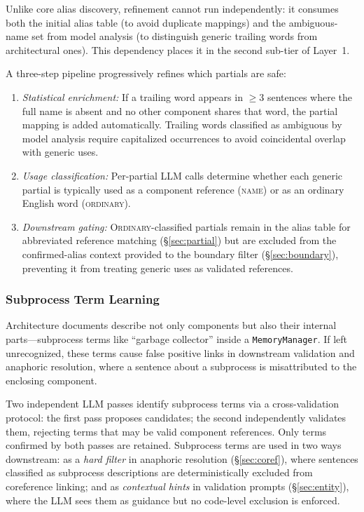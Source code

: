 Unlike core alias discovery, refinement cannot run independently:
it consumes both the initial alias table (to avoid duplicate mappings)
and the ambiguous-name set from model analysis (to distinguish generic
trailing words from architectural ones).
This dependency places it in the second sub-tier of Layer~1.

A three-step pipeline progressively refines which partials are safe:
\begin{enumerate}
    \item \emph{Statistical enrichment:}
      If a trailing word appears in $\ge3$ sentences where the full
      name is absent and no other component shares that word, the
      partial mapping is added automatically.
      Trailing words classified as ambiguous by model analysis
      require capitalized occurrences to avoid coincidental overlap
      with generic uses.
    \item \emph{Usage classification:}
      Per-partial LLM calls determine whether each generic partial
      is typically used as a component reference (\textsc{name}) or
      as an ordinary English word (\textsc{ordinary}).
    \item \emph{Downstream gating:}
      \textsc{Ordinary}-classified partials remain in the alias table
      for abbreviated reference matching (\S\ref{sec:partial})
      but are excluded from the confirmed-alias context provided to
      the boundary filter (\S\ref{sec:boundary}), preventing it from
      treating generic uses as validated references.
\end{enumerate}

\subsubsection{Subprocess Term Learning}\label{sec:subprocess}

Architecture documents describe not only components but also their
internal parts---subprocess terms like ``garbage collector'' inside a
\texttt{MemoryManager}.
If left unrecognized, these terms cause false positive links in
downstream validation and anaphoric resolution, where a sentence about
a subprocess is misattributed to the enclosing component.

Two independent LLM passes identify subprocess terms via a
cross-validation protocol:
the first pass proposes candidates; the second independently
validates them, rejecting terms that may be valid component references.
Only terms confirmed by both passes are retained.
Subprocess terms are used in two ways downstream:
as a \emph{hard filter} in anaphoric resolution (\S\ref{sec:coref}),
where sentences classified as subprocess descriptions are
deterministically excluded from coreference linking;
and as \emph{contextual hints} in validation prompts
(\S\ref{sec:entity}), where the LLM sees them as guidance but
no code-level exclusion is enforced.


